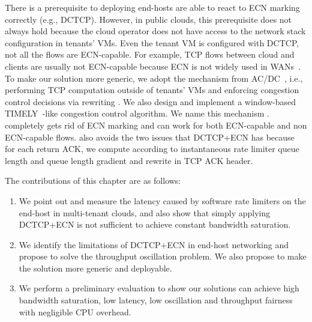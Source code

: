 There is a prerequisite to deploying \nameone \textemdash\xspace end-hosts are able to react to ECN marking correctly 
(e.g., DCTCP). However, in public clouds, this prerequisite does not always hold 
because the cloud operator does not have access to the network stack configuration in tenants' VMs. 
Even the tenant VM is configured with DCTCP, not all the flows are ECN-capable. For example,
TCP flows between cloud and clients are usually not ECN-capable because ECN is not widely used in WANs~\cite{kuhlewind2013state}.
To make our solution more generic, we adopt the mechanism from AC/DC~\cite{he2016ac}, 
i.e., performing TCP \cwnd computation outside of tenants' VMs and enforcing congestion control decisions via 
rewriting \rwnd. We also design and implement a window-based TIMELY~\cite{mittal2015timely}-like congestion control algorithm. 
We name this mechanism \nametwo. \nametwo completely gets rid of ECN marking and can work for 
both ECN-capable and non ECN-capable flows. 
\nametwo also avoids the two issues that DCTCP+ECN has because for each return ACK, 
we compute \cwnd according to instantaneous rate limiter queue length and queue length gradient and 
rewrite \rwnd in TCP ACK header. 

The contributions of this chapter are as follows:
\begin{enumerate}
\item We point out and measure the latency caused by software rate limiters on the end-host in multi-tenant clouds, 
and also show that simply applying DCTCP+ECN is not sufficient to achieve constant bandwidth saturation.

\item We identify the limitations of DCTCP+ECN in end-host networking and 
propose \nameone to solve the throughput oscillation problem.
We also propose \nametwo to make the solution more generic and deployable.

\item We perform a preliminary evaluation to show our solutions can achieve high bandwidth saturation, 
low latency, low oscillation and throughput fairness with negligible CPU overhead.

\iffalse
\item We measure the performance (latency and packet loss) of software rate limiters. We show that software rate limiters can greatly increase end-to-end latency for multi-tenant cloud networks. 
We also show that simply extending ECN in software rate limiter queues and enabling DCTCP on the end-points (i.e., VMs or Container) give sub-optimal performance. 

\item We propose two techniques (\nameone and \nametwo) to enable high throughput, low oscillation, low latency and generic software rate limiters for multi-tenant cloud networks.

\item We evaluate the performance of \nameone and \nametwo. The experiment results demonstrate that the proposed solutions achieve our design goals.
\fi
\end{enumerate}


